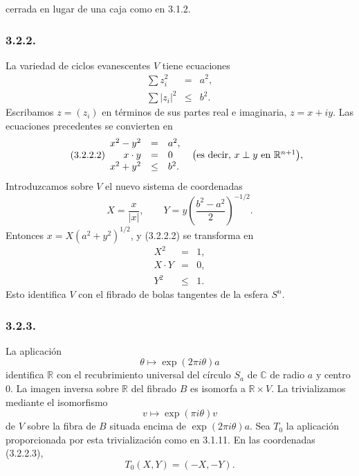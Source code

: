 \pageoriginale

cerrada en lugar de una caja como en 3.1.2.

\subsubsection*{3.2.2.}
La variedad de ciclos evanescentes $V$ tiene ecuaciones
\begin{equation}\tag{3.2.2.1}
\begin{array}{rcl}
\displaystyle\sum z_i^2&=&a^2,\\
\displaystyle\sum |z_i|^2&\leq&b^2.
\end{array}
\end{equation}
Escribamos $z=(z_i)$ en términos de sus partes real e imaginaria,
$z=x+iy$. Las ecuaciones precedentes se convierten en
\begin{equation}\tag{3.2.2.2}
\begin{array}{rcl}
x^2-y^2&=&a^2,\\
x\mathbin{\cdot}y&=&0
  \qquad\bigl(\text{es decir, }x\perp y\text{ en }
  \mathbb R^{\sisi{n}{n+1}}\bigr),\\
x^2+y^2&\leq&b^2.
\end{array}
\end{equation}
Introduzcamos sobre $V$ el nuevo sistema de coordenadas
\[
X=\frac{x}{|x|},
\qquad
Y=y\left(\frac{b^2-a^2}{2}\right)^{-1/2}.
\]
Entonces $x=X(a^2+y^2)^{1/2}$, y (3.2.2.2) se transforma en
\begin{equation}\tag{3.2.2.3}
\begin{array}{rcl}
X^2&=&1,\\
X\mathbin{\cdot}Y&=&0,\\
Y^2&\leq&1.
\end{array}
\end{equation}
Esto identifica $V$ con el fibrado de bolas tangentes de la esfera
$S^n$.

\subsubsection*{3.2.3.}
La aplicación
\[
\theta\longmapsto \exp(2\pi i\theta)a
\]
identifica $\mathbb R$ con el recubrimiento universal del círculo
$S_a$ de $\mathbb C$ de radio $a$ y centro $0$. La imagen inversa sobre
$\mathbb R$ del fibrado $B$ es isomorfa a $\mathbb R\times V$. La
trivializamos mediante el isomorfismo
\[
v\longmapsto \exp(\pi i\theta)v
\]
de $V$ sobre la fibra de $B$ situada encima de
$\exp(2\pi i\theta)a$. Sea $T_0$ la aplicación proporcionada por esta
trivialización como en 3.1.11. En las coordenadas (3.2.2.3),
\[
T_0(X,Y)=(-X,-Y).
\]

